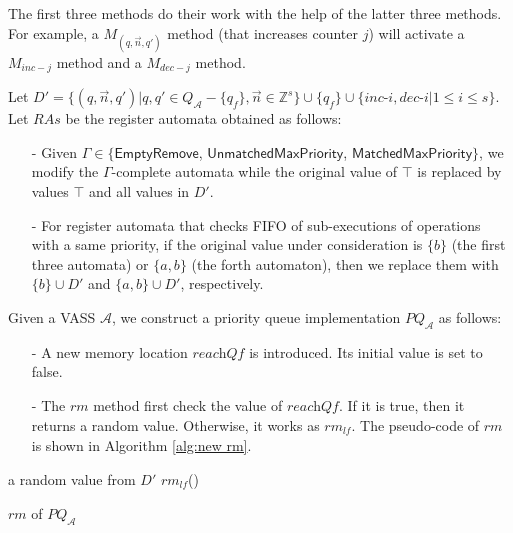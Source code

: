 The first three methods do their work with the help of the latter three methods. For example, a $M_{(q,\vec n,q')}$ method (that increases counter $j$) will activate a $M_{inc-j}$ method and a $M_{dec-j}$ method.

Let $D' = \{ (q,\vec n,q') \vert q,q' \in Q_{\mathcal{A}} - \{q_f\}, \vec n \in \mathbb{Z}^s \} \cup \{ q_f \} \cup \{\textit{inc-i},\textit{dec-i} \vert 1 \leq i \leq s\}$. Let $\textit{RAs}$ be the register automata obtained as follows:

\begin{itemize}
\setlength{\itemsep}{0.5pt}
\item[-] Given $\Gamma\in \{\mathsf{EmptyRemove}$, $\mathsf{UnmatchedMaxPriority}$, $\mathsf{MatchedMaxPriority}\}$, we modify the $\Gamma$-complete automata while the original value of $\top$ is replaced by values $\top$ and all values in $D'$.

\item[-] For register automata that checks FIFO of sub-executions of operations with a same priority, if the original value under consideration is $\{ b \}$ (the first three automata) or $\{a,b\}$ (the forth automaton), then we replace them with $\{ b \} \cup D'$ and $\{a,b\} \cup D'$, respectively.
\end{itemize}

Given a VASS $\mathcal{A}$, we construct a priority queue implementation $\textit{PQ}_{\mathcal{A}}$ as follows:

\begin{itemize}
\setlength{\itemsep}{0.5pt}
\item[-] A new memory location $\textit{reachQf}$ is introduced. Its initial value is set to false.

\item[-] The $\textit{rm}$ method first check the value of $\textit{reachQf}$. If it is true, then it returns a random value. Otherwise, it works as $\textit{rm}_{\textit{lf}}$. The pseudo-code of $\textit{rm}$ is shown in Algorithm \ref{alg:new rm}.
\end{itemize}


\begin{algorithm}[t]

{\KwRet a random value from $D'$\;}
\Else
{\KwRet $\textit{rm}_{\textit{lf}}$()\;}

\caption{$\textit{rm}$ of $\textit{PQ}_{\mathcal{A}}$}
\label{alg:new rm}
\end{algorithm}


